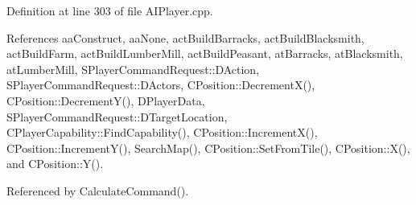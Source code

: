 Definition at line 303 of file A\+I\+Player.\+cpp.



References aa\+Construct, aa\+None, act\+Build\+Barracks, act\+Build\+Blacksmith, act\+Build\+Farm, act\+Build\+Lumber\+Mill, act\+Build\+Peasant, at\+Barracks, at\+Blacksmith, at\+Lumber\+Mill, S\+Player\+Command\+Request\+::\+D\+Action, S\+Player\+Command\+Request\+::\+D\+Actors, C\+Position\+::\+Decrement\+X(), C\+Position\+::\+Decrement\+Y(), D\+Player\+Data, S\+Player\+Command\+Request\+::\+D\+Target\+Location, C\+Player\+Capability\+::\+Find\+Capability(), C\+Position\+::\+Increment\+X(), C\+Position\+::\+Increment\+Y(), Search\+Map(), C\+Position\+::\+Set\+From\+Tile(), C\+Position\+::\+X(), and C\+Position\+::\+Y().



Referenced by Calculate\+Command().



